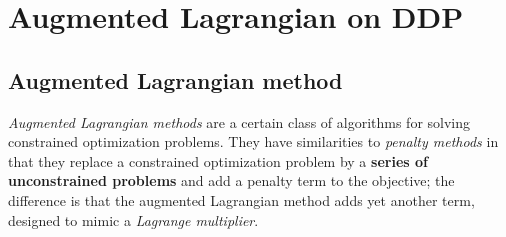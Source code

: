 \documentclass{report}
\begin{document}
%
%
%
%
%
%

\chapter{Augmented Lagrangian on DDP}
\section{Augmented Lagrangian method}
\emph{Augmented Lagrangian methods} are a certain class of algorithms for solving constrained optimization problems. They have similarities to \emph{penalty methods} in that they replace a constrained optimization problem by a \textbf{series of unconstrained problems} and add a penalty term to the objective; the difference is that the augmented Lagrangian method adds yet another term, designed to mimic a \emph{Lagrange multiplier}. 
\end{document}
